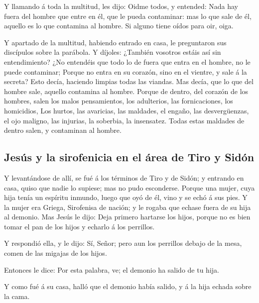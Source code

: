  Y llamando á toda la multitud, les dijo: Oidme todos, y
entended:  Nada hay fuera del hombre que entre en él, que
le pueda contaminar: mas lo que sale de él, aquello es lo que contamina
al hombre.  Si alguno tiene oídos para oir, oiga.

 Y apartado de la multitud, habiendo entrado en casa, le
preguntaron sus discípulos sobre la parábola.  Y díjoles:
¿También vosotros estáis así sin entendimiento? ¿No entendéis que todo
lo de fuera que entra en el hombre, no le puede contaminar;
 Porque no entra en su corazón, sino en el vientre, y
sale á la secreta? Esto decía, haciendo limpias todas las viandas.
 Mas decía, que lo que del hombre sale, aquello contamina
al hombre.  Porque de dentro, del corazón de los hombres,
salen los malos pensamientos, los adulterios, las fornicaciones, los
homicidios,  Los hurtos, las avaricias, las maldades, el
engaño, las desvergüenzas, el ojo maligno, las injurias, la soberbia, la
insensatez.  Todas estas maldades de dentro salen, y
contaminan al hombre.

\hypertarget{jesuxfas-y-la-sirofenicia-en-el-uxe1rea-de-tiro-y-siduxf3n}{%
\subsection{Jesús y la sirofenicia en el área de Tiro y
Sidón}\label{jesuxfas-y-la-sirofenicia-en-el-uxe1rea-de-tiro-y-siduxf3n}}

 Y levantándose de allí, se fué á los términos de Tiro y
de Sidón; y entrando en casa, quiso que nadie lo supiese; mas no pudo
esconderse.  Porque una mujer, cuya hija tenía un
espíritu inmundo, luego que oyó de él, vino y se echó á sus pies.
 Y la mujer era Griega, Sirofenisa de nación; y le rogaba
que echase fuera de su hija al demonio.  Mas Jesús le
dijo: Deja primero hartarse los hijos, porque no es bien tomar el pan de
los hijos y echarlo á los perrillos.

 Y respondió ella, y le dijo: Sí, Señor; pero aun los
perrillos debajo de la mesa, comen de las migajas de los hijos.

 Entonces le dice: Por esta palabra, ve; el demonio ha
salido de tu hija.

 Y como fué á su casa, halló que el demonio había salido,
y á la hija echada sobre la cama.

